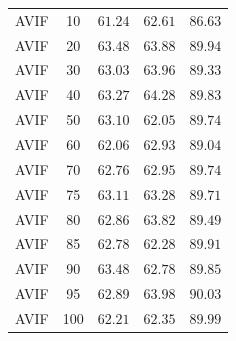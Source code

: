 \begin{table}[htbp]
\begin{tabular}{lcccc}
AVIF & 10 & $61.24$ & $62.61$ & $86.63$ \\
AVIF & 20 & $63.48$ & $63.88$ & $89.94$ \\
AVIF & 30 & $63.03$ & $63.96$ & $89.33$ \\
AVIF & 40 & $63.27$ & $64.28$ & $89.83$ \\
AVIF & 50 & $63.10$ & $62.05$ & $89.74$ \\
AVIF & 60 & $62.06$ & $62.93$ & $89.04$ \\
AVIF & 70 & $62.76$ & $62.95$ & $89.74$ \\
AVIF & 75 & $63.11$ & $63.28$ & $89.71$ \\
AVIF & 80 & $62.86$ & $63.82$ & $89.49$ \\
AVIF & 85 & $62.78$ & $62.28$ & $89.91$ \\
AVIF & 90 & $63.48$ & $62.78$ & $89.85$ \\
AVIF & 95 & $62.89$ & $63.98$ & $90.03$ \\
AVIF & 100 & $62.21$ & $62.35$ & $89.99$ \\
\hline
\end{tabular}
\end{table}